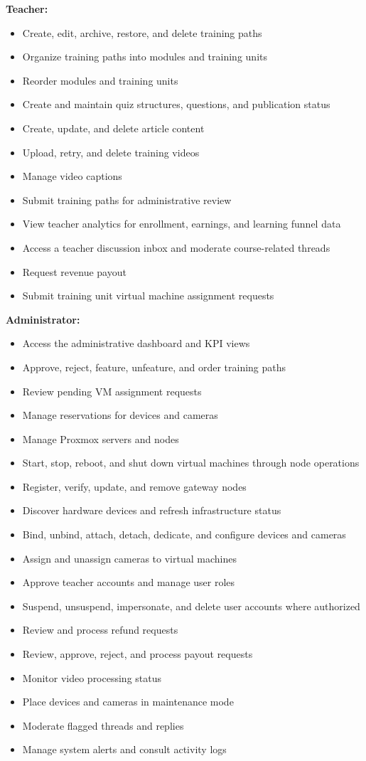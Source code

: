 \textbf{Teacher:}
\begin{itemize}[label=-]
    \item Create, edit, archive, restore, and delete training paths
    \item Organize training paths into modules and training units
    \item Reorder modules and training units
    \item Create and maintain quiz structures, questions, and publication status
    \item Create, update, and delete article content
    \item Upload, retry, and delete training videos
    \item Manage video captions
    \item Submit training paths for administrative review
    \item View teacher analytics for enrollment, earnings, and learning funnel data
    \item Access a teacher discussion inbox and moderate course-related threads
    \item Request revenue payout
    \item Submit training unit virtual machine assignment requests
\end{itemize}

\textbf{Administrator:}
\begin{itemize}[label=-]
    \item Access the administrative dashboard and KPI views
    \item Approve, reject, feature, unfeature, and order training paths
    \item Review pending VM assignment requests
    \item Manage reservations for devices and cameras
    \item Manage Proxmox servers and nodes
    \item Start, stop, reboot, and shut down virtual machines through node operations
    \item Register, verify, update, and remove gateway nodes
    \item Discover hardware devices and refresh infrastructure status
    \item Bind, unbind, attach, detach, dedicate, and configure devices and cameras
    \item Assign and unassign cameras to virtual machines
    \item Approve teacher accounts and manage user roles
    \item Suspend, unsuspend, impersonate, and delete user accounts where authorized
    \item Review and process refund requests
    \item Review, approve, reject, and process payout requests
    \item Monitor video processing status
    \item Place devices and cameras in maintenance mode
    \item Moderate flagged threads and replies
    \item Manage system alerts and consult activity logs
\end{itemize}

